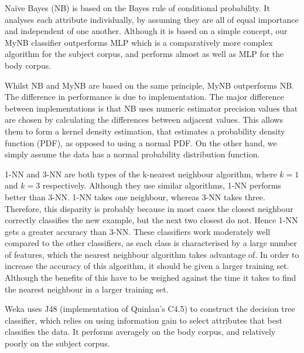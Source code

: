 \documentclass[10pt, a4paper]{article}
\begin{document}
Na\"ive Bayes (NB) is based on the Bayes rule of conditional probability. It analyses each attribute individually, by assuming they are all of equal importance and independent of one another. Although it is based on a simple concept, our MyNB classifier outperforms MLP which is a comparatively more complex algorithm for the subject corpus, and performs almost as well as MLP for the body corpus.

Whilst NB and MyNB are based on the same principle, MyNB outperforms NB. The difference in performance is due to implementation. The major difference between implementations is that NB uses numeric estimator precision values that are chosen by calculating the differences between adjacent values. This allows them to form a kernel density estimation, that estimates a probability density function (PDF), as opposed to using a normal PDF. On the other hand, we simply assume the data has a normal probability distribution function.

1-NN and 3-NN are both types of the k-nearest neighbour algorithm, where $k = 1$ and $k = 3$ respectively. Although they use similar algorithms, 1-NN performs better than 3-NN. 1-NN takes one neighbour, whereas 3-NN takes three. Therefore, this disparity is probably because in most cases the closest neighbour correctly classifies the new example, but the next two closest do not. Hence 1-NN gets a greater accuracy than 3-NN. These classifiers work moderately well compared to the other classifiers, as each class is characterised by a large number of features, which the nearest neighbour algorithm takes advantage of. In order to increase the accuracy of this algorithm, it should be given a larger training set. Although the benefits of this have to be weighed against the time it takes to find the nearest neighbour in a larger training set.

Weka uses J48 (implementation of Quinlan's C4.5) to construct the decision tree classifier, which relies on using information gain to select attributes that best classifies the data. It performs averagely on the body corpus, and relatively poorly on the subject corpus.

\end{document}
